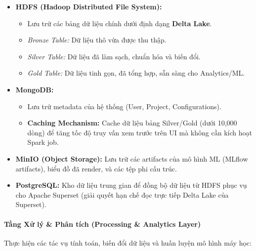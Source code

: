 \begin{itemize}
    \item \textbf{HDFS (Hadoop Distributed File System):}
    \begin{itemize}
        \item Lưu trữ các bảng dữ liệu chính dưới định dạng \textbf{Delta Lake}.
        \item \textit{Bronze Table:} Dữ liệu thô vừa được thu thập.
        \item \textit{Silver Table:} Dữ liệu đã làm sạch, chuẩn hóa và biến đổi.
        \item \textit{Gold Table:} Dữ liệu tinh gọn, đã tổng hợp, sẵn sàng cho Analytics/ML.
    \end{itemize}
    \item \textbf{MongoDB:}
    \begin{itemize}
        \item Lưu trữ metadata của hệ thống (User, Project, Configurations).
        \item \textbf{Caching Mechanism:} Cache dữ liệu bảng Silver/Gold (dưới 10,000 dòng) để tăng tốc độ truy vấn xem trước trên UI mà không cần kích hoạt Spark job.
    \end{itemize}
    \item \textbf{MinIO (Object Storage):} Lưu trữ các artifacts của mô hình ML (MLflow artifacts), biểu đồ đã render, và các tệp phi cấu trúc.
    \item \textbf{PostgreSQL:} Kho dữ liệu trung gian để đồng bộ dữ liệu từ HDFS phục vụ cho Apache Superset (giải quyết hạn chế đọc trực tiếp Delta Lake của Superset).
\end{itemize}

\paragraph{Tầng Xử lý \& Phân tích (Processing \& Analytics Layer)}
Thực hiện các tác vụ tính toán, biến đổi dữ liệu và huấn luyện mô hình máy học:

